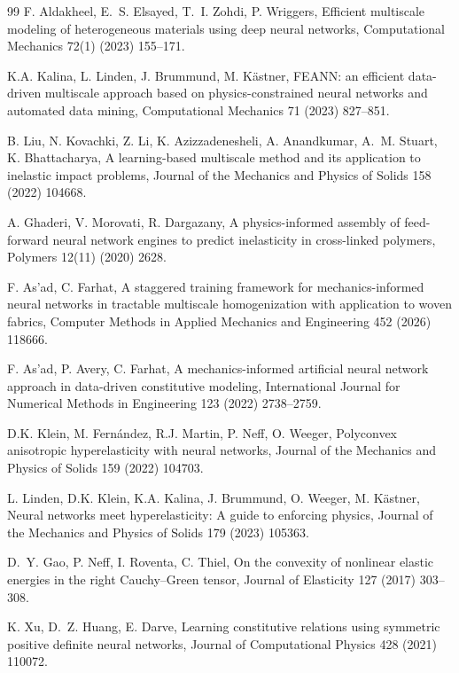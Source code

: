 \begin{thebibliography}{99}
F. Aldakheel, E.~S. Elsayed, T.~I. Zohdi, P. Wriggers, Efficient
multiscale modeling of heterogeneous materials using deep neural
networks, Computational Mechanics 72(1) (2023) 155--171.

K.A. Kalina, L. Linden, J. Brummund, M. K\"astner, FEANN: an efficient data-driven multiscale approach based on physics-constrained neural networks and automated data mining, Computational Mechanics 71 (2023) 827--851. 

B. Liu, N. Kovachki, Z. Li, K. Azizzadenesheli, A. Anandkumar, A.~M.
Stuart, K. Bhattacharya, A learning-based multiscale method and its
application to inelastic impact problems, Journal of the
Mechanics and Physics of Solids 158 (2022) 104668.

A. Ghaderi, V. Morovati, R. Dargazany, A physics-informed assembly of
feed-forward neural network engines to predict inelasticity in
cross-linked polymers, Polymers 12(11) (2020) 2628.

F. As'ad, C. Farhat, A staggered training framework for
mechanics-informed neural networks in tractable multiscale
homogenization with application to woven fabrics, Computer
Methods in Applied Mechanics and Engineering 452 (2026) 118666.

F. As'ad, P. Avery, C. Farhat, A mechanics-informed artificial neural network approach in data-driven constitutive modeling, International Journal for Numerical Methods in Engineering 123 (2022) 2738--2759. 

D.K. Klein, M. Fern\'andez, R.J. Martin, P. Neff, O. Weeger, Polyconvex anisotropic hyperelasticity with neural networks, Journal of the Mechanics and Physics of Solids 159 (2022) 104703. 

L. Linden, D.K. Klein, K.A. Kalina, J. Brummund, O. Weeger, M. K\"astner,
Neural networks meet hyperelasticity: A guide to enforcing physics,
Journal of the Mechanics and Physics of Solids 179 (2023) 105363.

D.~Y. Gao, P. Neff, I. Roventa, C. Thiel, On the convexity of
nonlinear elastic energies in the right Cauchy--Green tensor,
Journal of Elasticity 127 (2017) 303--308.

K. Xu, D.~Z. Huang, E. Darve, Learning constitutive relations using
symmetric positive definite neural networks,
Journal of Computational Physics 428 (2021) 110072.


\end{thebibliography}
